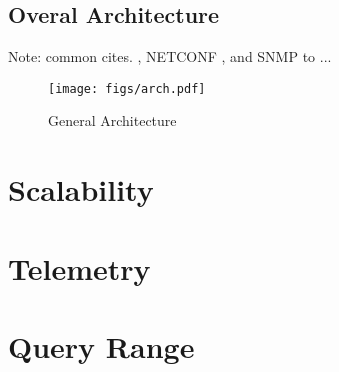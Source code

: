 \documentclass[11pt,sigconf]{iabart}
\begin{document}
\subsection{Overal Architecture} \label{overview}

Note: common cites.  \cite{rfc8342}, NETCONF \cite{rfc6241}, and SNMP \cite{rfc3411} to ...
\begin{figure}[h]
  \centering
  \texttt{[image: figs/arch.pdf]}
  \caption{General Architecture}
  \label{fig:overall_architecture}
\end{figure}

\section{Scalability} \label{scalability}



\section{Telemetry} \label{telemetry}


\section{Query Range} \label{queryrange} 

\end{document}
